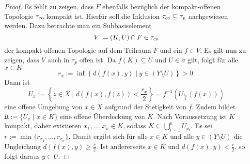 \begin{proof}
  Es fehlt zu zeigen, dass $F$ ebenfalls bezüglich der kompakt\hyp{}offenen Topologie $\tau_{\mathrm{co}}$ kompakt ist.
  Hierfür soll die Inklusion $\tau_{\mathrm{co}} \subseteq \tau_p$ nachgewiesen werden.
  Dazu betrachte man ein Subbasiselement 
  \begin{displaymath}
    V := (K,U) \cap F \in \tau_{\mathrm{co}}
  \end{displaymath}
  der kompakt\hyp{}offenen Topologie auf dem Teilraum $F$ und ein $f \in V$.
  Es gilt nun zu zeigen, dass $V$ auch in $\tau_p$ offen ist.
  Da $f(K) \subseteq U$ und $U \in \sigma$ gilt, folgt für alle $x \in K$
  \begin{displaymath}
    r_x := \inf\left\{d(f(x),y) \mid y \in (Y \setminus U) \right\} > 0.
  \end{displaymath}
  Dann ist 
  \begin{displaymath}
    U_x := \left\{ z \in X \mid d(f(x),f(z)) < \frac{r_x}{2}\right\} = f^{-1}\left( U_{\frac{r_x}{2}}(f(x))\right)
  \end{displaymath} 
  eine offene Umgebung von $x \in X$ aufgrund der Stetigkeit von $f$.
  Zudem bildet $\mathfrak{U} := \{U_x \mid x \in K\}$ eine offene Überdeckung von $K$. 
  Nach Voraussetzung ist $K$ kompakt, daher existieren $x_1,\dots,x_n \in K$, sodass $K \subseteq \bigcup_{i=1}^n U_{x_i}$.
  Es sei $r:= \min\{r_{x_1},\dots,r_{x_n}\}$. 
  Damit ergibt sich für alle $x \in K$ und alle $y \in (Y \setminus U)$ die Ungleichung $d(f(x),y) \geq \frac{r}{2}$.
  Ist andererseits $x \in K$ und $d(f(x),y) < \frac{r}{2}$, so folgt daraus $y \in U$.


\end{proof}
